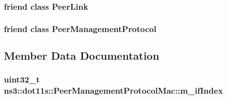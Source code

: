 \subsubsection[{\texorpdfstring{Peer\+Link}{PeerLink}}]{\setlength{\rightskip}{0pt plus 5cm}friend class {\bf Peer\+Link}\hspace{0.3cm}{\ttfamily [friend]}}\hypertarget{classns3_1_1dot11s_1_1PeerManagementProtocolMac_a0e7a63dea9bb09d1e45d9e8fd62d3a40}{}\label{classns3_1_1dot11s_1_1PeerManagementProtocolMac_a0e7a63dea9bb09d1e45d9e8fd62d3a40}
\subsubsection[{\texorpdfstring{Peer\+Management\+Protocol}{PeerManagementProtocol}}]{\setlength{\rightskip}{0pt plus 5cm}friend class {\bf Peer\+Management\+Protocol}\hspace{0.3cm}{\ttfamily [friend]}}\hypertarget{classns3_1_1dot11s_1_1PeerManagementProtocolMac_aad3da9b62656f5a6e24156893dc4e239}{}\label{classns3_1_1dot11s_1_1PeerManagementProtocolMac_aad3da9b62656f5a6e24156893dc4e239}


\subsection{Member Data Documentation}
\subsubsection[{\texorpdfstring{m\+\_\+if\+Index}{m_ifIndex}}]{\setlength{\rightskip}{0pt plus 5cm}uint32\+\_\+t ns3\+::dot11s\+::\+Peer\+Management\+Protocol\+Mac\+::m\+\_\+if\+Index\hspace{0.3cm}{\ttfamily [private]}}\hypertarget{classns3_1_1dot11s_1_1PeerManagementProtocolMac_a6127e7b929975cae23d8ef639e254991}{}\label{classns3_1_1dot11s_1_1PeerManagementProtocolMac_a6127e7b929975cae23d8ef639e254991}


